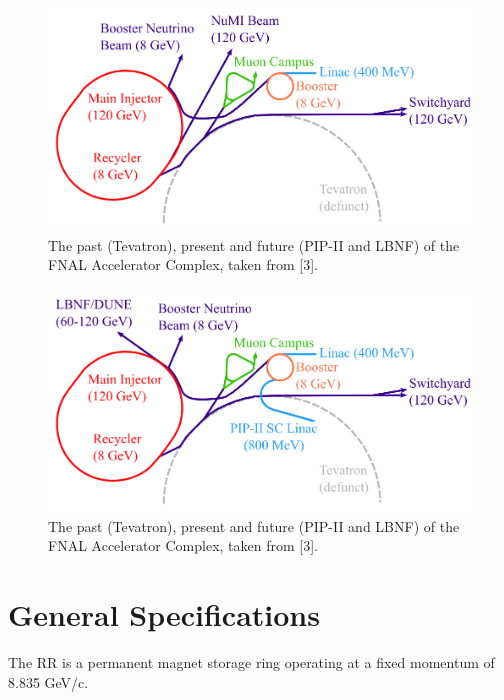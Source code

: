 \begin{figure}[H]
   \centering
   \includegraphics[width=\columnwidth]{chapter3/complex.png}
   \caption{The past (Tevatron), present and future (PIP-II and LBNF) of the FNAL Accelerator Complex, taken from [3].}
   \label{fig:fnal}
\end{figure}

\begin{figure}[H]
   \centering
   \includegraphics[width=\columnwidth]{chapter3/complexPIPII.png}
   \caption{The past (Tevatron), present and future (PIP-II and LBNF) of the FNAL Accelerator Complex, taken from [3].}
   \label{fig:fnalpip2}
\end{figure}

\section{General Specifications}

The RR is a permanent magnet storage ring operating at a fixed momentum of 8.835 GeV/c.
\cite{pipII1} \cite{rr2}


